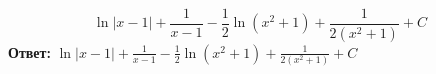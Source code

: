 \documentclass[a4paper]{article}
\begin{document}
\begin{enumerate}
\begin{enumerate}
   \[
   \ln|x - 1| + \frac{1}{x - 1} - \frac{1}{2} \ln(x^2 + 1) + \frac{1}{2(x^2 + 1)} + C
   \]  
   \textbf{Ответ:} $\ln|x - 1| + \frac{1}{x - 1} - \frac{1}{2} \ln(x^2 + 1) + \frac{1}{2(x^2 + 1)} + C$
\end{enumerate}


\end{enumerate}
\end{document}
